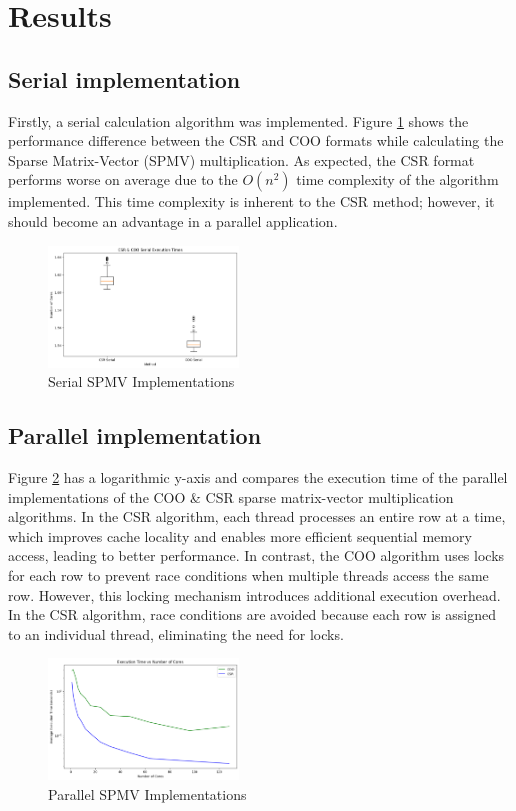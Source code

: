 \documentclass[conference]{IEEEtran}
\begin{document}
\section{Results}

\subsection{Serial implementation}
Firstly, a serial calculation algorithm was implemented. Figure \ref{fig:serial} shows the performance difference between the CSR and COO formats while calculating the Sparse Matrix-Vector (SPMV) multiplication. As expected, the CSR format performs worse on average due to the $O(n^2)$ time complexity of the algorithm implemented. 
This time complexity is inherent to the CSR method; however, it should become an advantage in a parallel application.
\begin{figure}[H]
    \centering
    \includegraphics[width=0.45\textwidth]{../img/serial.png}
    \caption{Serial SPMV Implementations}
    \label{fig:serial}
\end{figure}

\subsection{Parallel implementation}
Figure \ref{fig:parallel} has a logarithmic y-axis and compares the execution time of the parallel implementations of the COO \& CSR sparse matrix-vector multiplication algorithms.
In the CSR algorithm, each thread processes an entire row at a time, which improves cache locality and enables more efficient sequential memory access, leading to better performance. In contrast, the COO algorithm uses locks for each row to prevent race conditions when multiple threads access the same row. However, this locking mechanism introduces additional execution overhead. In the CSR algorithm, race conditions are avoided because each row is assigned to an individual thread, eliminating the need for locks.
\begin{figure}[H]
    \centering
    \includegraphics[width=0.45\textwidth]{../img/parallel.png}
    \caption{Parallel SPMV Implementations}
    \label{fig:parallel}
\end{figure}
\end{document}
